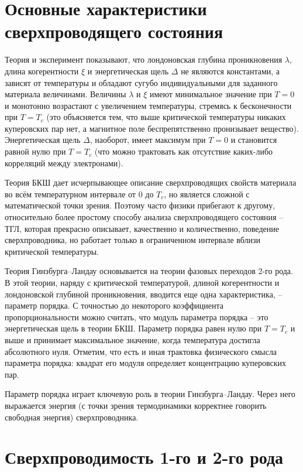 \section{Основные характеристики сверхпроводящего состояния}

Теория и эксперимент показывают, что лондоновская глубина проникновения 
\( \lambda \), длина когерентности \( \xi \) и энергетическая щель 
\( \Delta \) не являются константами, а зависят от температуры и обладают 
сугубо индивидуальными для заданного материала величинами. Величины 
\( \lambda \) и \( \xi \) имеют минимальное значение при \( T = 0 \) и 
монотонно возрастают с увеличением температуры, стремясь к бесконечности при 
\( T = T_c \) (это объясняется тем, что выше критической температуры никаких 
куперовских пар нет, а магнитное поле беспрепятственно пронизывает вещество). 
Энергетическая щель \( \Delta \), наоборот, имеет максимум при \( T = 0 \) и 
становится равной нулю при \( T = T_c \) (что можно трактовать как отсутствие 
каких-либо корреляций между электронами).

Теория БКШ дает исчерпывающее описание сверхпроводящих свойств материала во 
всём температурном интервале от \( 0 \) до \( T_c \), но является сложной с 
математической точки зрения. Поэтому часто физики прибегают к другому, 
относительно более простому способу анализа сверхпроводящего состояния -- ТГЛ, 
которая прекрасно описывает, качественно и количественно, поведение 
сверхпроводника, но работает только в ограниченном интервале вблизи 
критической температуры.

Теория Гинзбурга–Ландау основывается на теории фазовых переходов 2-го рода. В 
этой теории, наряду с критической температурой, длиной когерентности и 
лондоновской глубиной проникновения, вводится еще одна характеристика, -- 
параметр порядка. С точностью до некоторого коэффициента пропорциональности 
можно считать, что модуль параметра порядка -- это энергетическая щель в 
теории БКШ. Параметр порядка равен нулю при \( T = T_c \) и выше и принимает 
максимальное значение, когда температура достигла абсолютного нуля. Отметим, 
что есть и иная трактовка физического смысла параметра порядка: квадрат его 
модуля определяет концентрацию куперовских пар.

Параметр порядка играет ключевую роль в теории Гинзбурга–Ландау. Через него 
выражается энергия (с точки зрения термодинамики корректнее говорить 
свободная энергия) сверхпроводника.\cite{bib:net}

\section{Сверхпроводимость 1-го и 2-го рода}

